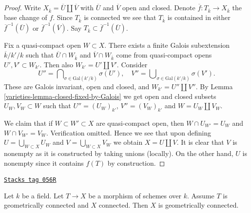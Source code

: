 \begin{proof}

Write $X_{\overline{k}} = \overline{U} \amalg \overline{V}$
with $\overline{U}$ and $\overline{V}$ open and closed.
Denote $\overline{f} : T_{\overline{k}} \to X_{\overline{k}}$ the base
change of $f$. Since $T_{\overline{k}}$ is connected we see that
$T_{\overline{k}}$ is contained in either $\overline{f}^{-1}(\overline{U})$
or $\overline{f}^{-1}(\overline{V})$.
Say $T_{\overline{k}} \subset \overline{f}^{-1}(\overline{U})$.

\medskip\noindent
Fix a quasi-compact open $W \subset X$. There exists a
finite Galois subextension $\overline{k}/k'/k$
such that $\overline{U} \cap W_{\overline{k}}$ and
$\overline{V} \cap W_{\overline{k}}$ come from quasi-compact
opens $U', V' \subset W_{k'}$. Then also $W_{k'} = U' \amalg V'$.
Consider
$$
U'' = \bigcap\nolimits_{\sigma \in \text{Gal}(k'/k)} \sigma(U'),
\quad
V'' = \bigcup\nolimits_{\sigma \in \text{Gal}(k'/k)} \sigma(V').
$$
These are Galois invariant, open and closed, and
$W_{k'} = U'' \amalg V''$.
By Lemma \ref{varieties-lemma-closed-fixed-by-Galois} we get open and closed subsets
$U_W, V_W \subset W$ such that
$U'' = (U_W)_{k'}$, $V'' = (V_W)_{k'}$ and
$W = U_W \amalg V_W$.

\medskip\noindent
We claim that if $W \subset W' \subset X$ are quasi-compact
open, then $W \cap U_{W'} = U_W$ and $W \cap V_{W'} = V_W$.
Verification omitted.
Hence we see that upon defining $U = \bigcup_{W \subset X} U_W$
and $V = \bigcup_{W \subset X} V_W$ we obtain $X = U \amalg V$.
It is clear that $V$ is nonempty as it is constructed by taking
unions (locally). On the other hand, $U$ is nonempty since it contains
$f(T)$ by construction.
\end{proof}

\begin{lemma}
\label{varieties-lemma-geometrically-connected-criterion}
\href{https://stacks.math.columbia.edu/tag/056R}{\texttt{Stacks tag 056R}}

\begin{reference}
\cite[IV Corollary 4.5.13.1(i)]{EGA}
\end{reference}
Let $k$ be a field. Let $T \to X$ be a morphism of schemes over $k$.
Assume $T$ is geometrically connected and $X$ connected.
Then $X$ is geometrically connected.
\end{lemma}

